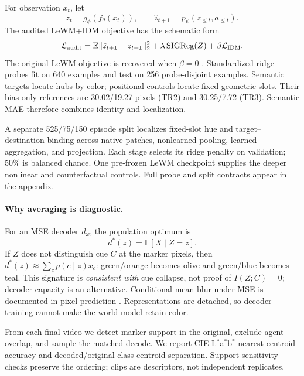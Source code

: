 \documentclass{article}
\begin{document}
For observation $x_t$, let
\begin{equation}
 z_t=g_\phi(f_\theta(x_t)), \qquad
 \hat z_{t+1}=p_\psi(z_{\leq t},a_{\leq t}).
 \label{eq:jepa}
\end{equation}
The audited LeWM+IDM objective has the schematic form
\begin{equation}
 \mathcal L_{\rm audit}=\mathbb E\|\hat z_{t+1}-z_{t+1}\|_2^2
 +\lambda\,\mathrm{SIGReg}(Z)+\beta\mathcal L_{\rm IDM}.
 \label{eq:lewm-objective}
\end{equation}
The original LeWM objective is recovered when $\beta=0$
\citep{balestriero2025lejepa,maes2026leworldmodel}.  Standardized ridge probes
fit on 640 examples and test on 256 probe-disjoint examples.  Semantic targets
locate hubs by color; positional controls locate fixed geometric slots.  Their
bias-only references are 30.02/19.27 pixels (TR2) and 30.25/7.72 (TR3).
Semantic MAE therefore combines identity and localization.

A separate 525/75/150 episode split localizes fixed-slot hue and
target--destination binding across native patches, nonlearned pooling, learned
aggregation, and projection.  Each stage selects its ridge penalty on
validation; 50\% is balanced chance.  One pre-frozen LeWM checkpoint supplies
the deeper nonlinear and counterfactual controls.  Full probe and split
contracts appear in the appendix.

\paragraph{Why averaging is diagnostic.}
For an MSE decoder $d_\omega$, the population optimum is
\begin{equation}
 d^*(z)=\mathbb E[X\mid Z=z].
 \label{eq:conditional-mean}
\end{equation}
If $Z$ does not distinguish cue $C$ at the marker pixels, then
$d^*(z)\approx\sum_c p(c\mid z)x_c$: green/orange becomes olive and
green/blue becomes teal.  This signature is \emph{consistent with} cue
collapse, not proof of $I(Z;C)=0$; decoder capacity is an alternative.
Conditional-mean blur under MSE is documented in pixel prediction
\citep{mathieu2016video}.  Representations are detached, so decoder training
cannot make the world model retain color.

From each final video we detect marker support in the original, exclude agent
overlap, and sample the matched decode.  We report CIE L$^*$a$^*$b$^*$
nearest-centroid accuracy and decoded/original class-centroid separation.
Support-sensitivity checks preserve the ordering; clips are descriptors, not
independent replicates.
\end{document}

